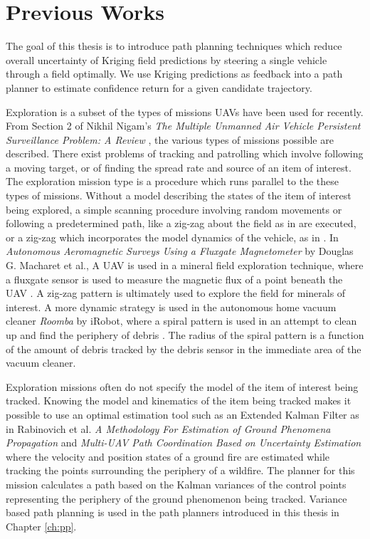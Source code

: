 \section{Previous Works} \label{sec:prev_works}
The goal of this thesis is to introduce path planning techniques which reduce overall uncertainty of Kriging field predictions by steering a single vehicle through a field optimally. We use Kriging predictions as feedback into a path planner to estimate confidence return for a given candidate trajectory.

Exploration is a subset of the types of missions UAVs have been used for recently. From Section 2 of Nikhil Nigam's \textit{The Multiple Unmanned Air Vehicle Persistent Surveillance Problem: A Review} \cite{nigam:missions}, the various types of missions possible are described. There exist problems of tracking and patrolling which involve following a moving target, or of finding the spread rate and source of an item of interest. The exploration mission type is a procedure which runs parallel to the these types of missions. Without a model describing the states of the item of interest being explored, a simple scanning procedure involving random movements or following a predetermined path, like a zig-zag about the field as in \cite{semsch:uav_zig} are executed, or a zig-zag which incorporates the model dynamics of the vehicle, as in \cite{nigam:zigzag}. In \textit{Autonomous Aeromagnetic Surveys Using a Fluxgate Magnetometer} by Douglas G. Macharet et al., A UAV is used in a mineral field exploration technique, where a fluxgate sensor is used to measure the magnetic flux of a point beneath the UAV \cite{macharet:magnet}. A zig-zag pattern is ultimately used to explore the field for minerals of interest. A more dynamic strategy is used in the autonomous home vacuum cleaner \textit{Roomba} by iRobot, where a spiral pattern is used in an attempt to clean up and find the periphery of debris \cite{roomba:spiral}. The radius of the spiral pattern is a function of the amount of debris tracked by the debris sensor in the immediate area of the vacuum cleaner.

Exploration missions often do not specify the model of the item of interest being tracked. Knowing the model and kinematics of the item being tracked makes it possible to use an optimal estimation tool such as an Extended Kalman Filter as in Rabinovich et al. \textit{A Methodology For Estimation of Ground Phenomena Propagation} \cite{sharon:uav_est} and \textit{Multi-UAV Path Coordination Based on Uncertainty Estimation} \cite{sharon:uav_uncert} where the velocity and position states of a ground fire are estimated while tracking the points surrounding the periphery of a wildfire. The planner for this mission calculates a path based on the Kalman variances of the control points representing the periphery of the ground phenomenon being tracked. Variance based path planning is used in the path planners introduced in this thesis in Chapter \ref{ch:pp}.

